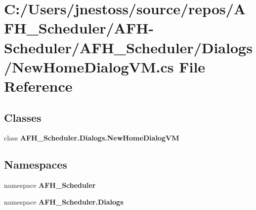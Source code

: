 \section{C\+:/\+Users/jnestoss/source/repos/\+A\+F\+H\+\_\+\+Scheduler/\+A\+F\+H-\/\+Scheduler/\+A\+F\+H\+\_\+\+Scheduler/\+Dialogs/\+New\+Home\+Dialog\+VM.cs File Reference}
\label{_new_home_dialog_v_m_8cs}
\subsection*{Classes}
\begin{DoxyCompactItemize}
\item 
class \textbf{ A\+F\+H\+\_\+\+Scheduler.\+Dialogs.\+New\+Home\+Dialog\+VM}
\end{DoxyCompactItemize}
\subsection*{Namespaces}
\begin{DoxyCompactItemize}
\item 
namespace \textbf{ A\+F\+H\+\_\+\+Scheduler}
\item 
namespace \textbf{ A\+F\+H\+\_\+\+Scheduler.\+Dialogs}
\end{DoxyCompactItemize}
